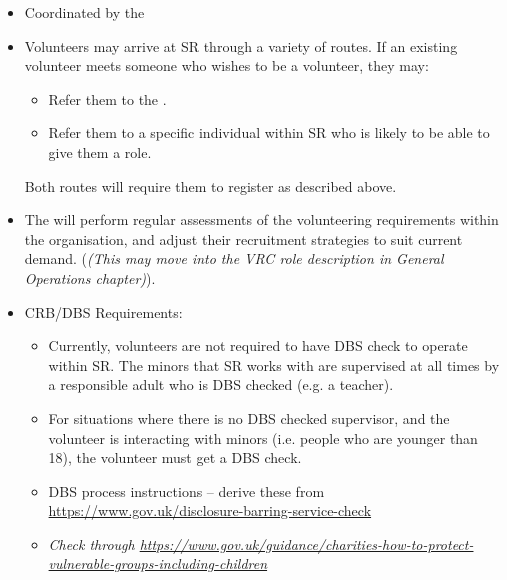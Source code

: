 \begin{itemize}
\item Coordinated by the 
\item Volunteers may arrive at SR through a variety of routes.  If an existing volunteer meets someone who wishes to be a volunteer, they may:
  \begin{itemize}
  \item Refer them to the .
  \item Refer them to a specific individual within SR who is likely to be able to give them a role.
  \end{itemize}
Both routes will require them to register as described above.
  
\item The  will perform regular assessments of the volunteering requirements within the organisation, and adjust their recruitment strategies to suit current demand. (\textit{(This may move into the VRC role description in General Operations chapter)}).

\item CRB/DBS Requirements:
  \begin{itemize}
  \item Currently, volunteers are not required to have  DBS check to operate within SR.  The minors that SR works with are supervised at all times by a responsible adult who is DBS checked (e.g. a teacher).
  \item For situations where there is no DBS checked supervisor, and the volunteer is interacting with minors (i.e. people who are younger than 18), the volunteer must get a DBS check.
  \item DBS process instructions -- derive these from \url{https://www.gov.uk/disclosure-barring-service-check}
  \item \textit{Check through \url{https://www.gov.uk/guidance/charities-how-to-protect-vulnerable-groups-including-children}}
  \end{itemize}
\end{itemize}
